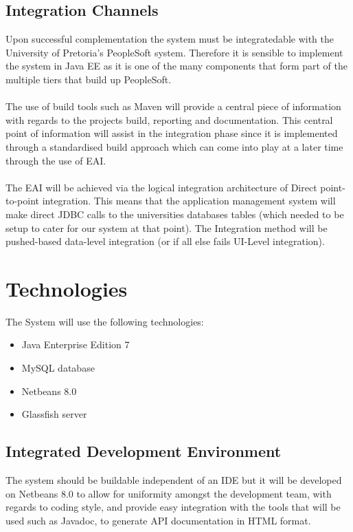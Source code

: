 \documentclass[12pt]{article}
\begin{document}
\subsection{Integration Channels}
Upon successful complementation the system must be integratedable with the University of Pretoria's PeopleSoft system. Therefore it is sensible to implement the system in Java EE as it is one of the many components that form part of the multiple tiers that build up  PeopleSoft. \\
\\
The use of build tools such as Maven will provide a central piece of information with regards to the projects build, reporting and documentation. This central point of information will assist in the integration phase since it is implemented through a standardised build approach which can come into play at a later time through the use of EAI.\\
\\
The EAI will be achieved via  the logical integration architecture of Direct point-to-point integration. This means that the application management system will make direct JDBC calls to the universities databases tables (which needed to be setup to cater for our system at that point). The Integration method will be pushed-based data-level integration (or if all else fails UI-Level integration).

\section{Technologies}
The System will use the following technologies:
\begin{itemize}
\item Java Enterprise Edition 7
\item MySQL database
\item Netbeans 8.0
\item Glassfish server
\end{itemize}

\subsection*{Integrated Development Environment}
The system should be buildable independent of an IDE but it will be developed on Netbeans 8.0 to allow for uniformity amongst the development team, with regards to coding style, and provide easy integration with the tools that will be used such as Javadoc, to generate  API documentation in HTML format.
\end{document}

